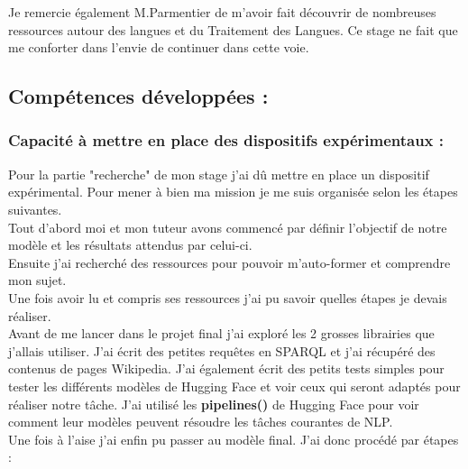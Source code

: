 \documentclass[12pt]{article}
\begin{document}
Je remercie également M.Parmentier de m'avoir fait découvrir de  nombreuses ressources autour des langues et du Traitement des Langues. Ce stage ne fait que me conforter dans l'envie de continuer dans cette voie. 

\subsection{Compétences développées :}

\subsubsection{Capacité à mettre en place des dispositifs expérimentaux :}

Pour la partie "recherche" de mon stage j'ai dû mettre en place un dispositif expérimental. Pour mener à bien ma mission je me suis organisée selon les étapes suivantes. \\
Tout d'abord moi et mon tuteur avons commencé par définir l'objectif de notre modèle et les résultats attendus par celui-ci. \\
Ensuite j'ai recherché des ressources pour pouvoir m'auto-former et comprendre mon sujet. \\
Une fois avoir lu et compris ses ressources j'ai pu savoir quelles étapes je devais réaliser. \\
Avant de me lancer dans le projet final j'ai exploré les 2 grosses librairies que j'allais utiliser. J'ai écrit des petites requêtes en SPARQL et j'ai récupéré des contenus de pages Wikipedia. J'ai également  écrit des petits tests simples pour tester les différents modèles de Hugging Face et voir ceux qui seront adaptés pour réaliser notre tâche. J'ai utilisé les \textbf{pipelines()} de Hugging Face pour voir comment leur modèles peuvent résoudre les tâches courantes de NLP. \\
Une fois à l'aise j'ai enfin pu passer au modèle final. J'ai donc procédé par étapes :
\end{document}
